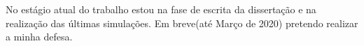 No estágio atual do trabalho estou na fase de escrita da dissertação e na realização das últimas simulações. Em breve(até Março de 2020) pretendo realizar a minha defesa.